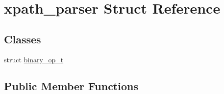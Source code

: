 \hypertarget{structxpath__parser}{}\section{xpath\+\_\+parser Struct Reference}
\label{structxpath__parser}
\subsection*{Classes}
\begin{DoxyCompactItemize}
\item 
struct \hyperlink{structxpath__parser_1_1binary__op__t}{binary\+\_\+op\+\_\+t}
\end{DoxyCompactItemize}
\subsection*{Public Member Functions}
